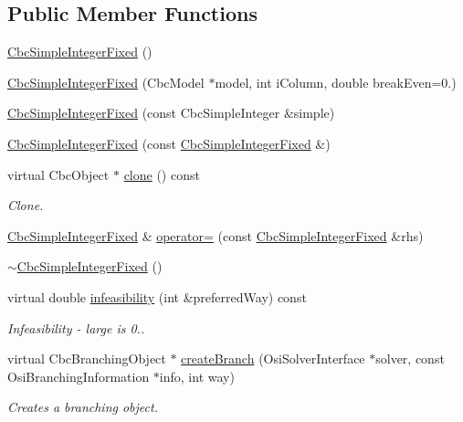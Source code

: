 \subsection*{Public Member Functions}
\begin{DoxyCompactItemize}
\item 
\hyperlink{classCbcSimpleIntegerFixed_adaf8dcc71fcace1dc3bf84f8e638e048}{Cbc\+Simple\+Integer\+Fixed} ()
\item 
\hyperlink{classCbcSimpleIntegerFixed_a94a2a9c4b78e24d5e8b06f65c9bc1d7d}{Cbc\+Simple\+Integer\+Fixed} (Cbc\+Model $\ast$model, int i\+Column, double break\+Even=0.)
\item 
\hyperlink{classCbcSimpleIntegerFixed_a5c44905a5afeff92aea35d9d4f163a9d}{Cbc\+Simple\+Integer\+Fixed} (const Cbc\+Simple\+Integer \&simple)
\item 
\hyperlink{classCbcSimpleIntegerFixed_a6977f8319dc02ba6a79f9f05f608c8e2}{Cbc\+Simple\+Integer\+Fixed} (const \hyperlink{classCbcSimpleIntegerFixed}{Cbc\+Simple\+Integer\+Fixed} \&)
\item 
virtual Cbc\+Object $\ast$ \hyperlink{classCbcSimpleIntegerFixed_a0738b48257886ddaf189f1fabd51d025}{clone} () const
\begin{DoxyCompactList}\small\item\em Clone. \end{DoxyCompactList}\item 
\hyperlink{classCbcSimpleIntegerFixed}{Cbc\+Simple\+Integer\+Fixed} \& \hyperlink{classCbcSimpleIntegerFixed_aa10030277dff562633a4a51bf4d988d7}{operator=} (const \hyperlink{classCbcSimpleIntegerFixed}{Cbc\+Simple\+Integer\+Fixed} \&rhs)
\item 
\hyperlink{classCbcSimpleIntegerFixed_a6d59a37e73e3ecafe7e158faf25810e6}{$\sim$\+Cbc\+Simple\+Integer\+Fixed} ()
\item 
virtual double \hyperlink{classCbcSimpleIntegerFixed_aa13190a7a35f67aeccf0ed37062e635e}{infeasibility} (int \&preferred\+Way) const
\begin{DoxyCompactList}\small\item\em Infeasibility -\/ large is 0.. \end{DoxyCompactList}\item 
virtual Cbc\+Branching\+Object $\ast$ \hyperlink{classCbcSimpleIntegerFixed_a2d30611fcda59c1503153689875e085e}{create\+Branch} (Osi\+Solver\+Interface $\ast$solver, const Osi\+Branching\+Information $\ast$info, int way)
\begin{DoxyCompactList}\small\item\em Creates a branching object. \end{DoxyCompactList}\end{DoxyCompactItemize}


